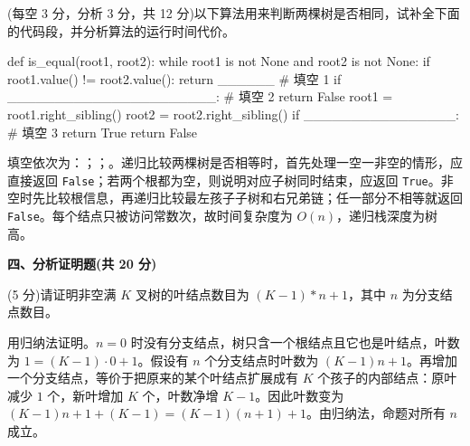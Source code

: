 \begin{question}
(每空 3 分，分析 3 分，共 12 分)以下算法用来判断两棵树是否相同，试补全下面的代码段，并分析算法的运行时间代价。
\begin{pycode}
def is_equal(root1, root2):
    while root1 is not None and root2 is not None:
        if root1.value() != root2.value():
            return ______          # 填空 1
        if ______________________: # 填空 2
            return False
        root1 = root1.right_sibling()
        root2 = root2.right_sibling()
    if ________________:           # 填空 3
        return True
    return False
\end{pycode}
\begin{solution}
填空依次为：\texttt{}；\texttt{}；\texttt{}。递归比较两棵树是否相等时，首先处理一空一非空的情形，应直接返回 \texttt{False}；若两个根都为空，则说明对应子树同时结束，应返回 \texttt{True}。非空时先比较根信息，再递归比较最左孩子子树和右兄弟链；任一部分不相等就返回 \texttt{False}。每个结点只被访问常数次，故时间复杂度为 $O(n)$，递归栈深度为树高。
\end{solution}
\end{question}

\textbf{四、分析证明题(共 20 分)}

\begin{question}
(5 分)请证明非空满 $K$ 叉树的叶结点数目为 $(K-1)*n+1$，其中 $n$ 为分支结点数目。
\begin{solution}
用归纳法证明。$n=0$ 时没有分支结点，树只含一个根结点且它也是叶结点，叶数为 $1=(K-1)\cdot0+1$。假设有 $n$ 个分支结点时叶数为 $(K-1)n+1$。再增加一个分支结点，等价于把原来的某个叶结点扩展成有 $K$ 个孩子的内部结点：原叶减少 $1$ 个，新叶增加 $K$ 个，叶数净增 $K-1$。因此叶数变为 $(K-1)n+1+(K-1)=(K-1)(n+1)+1$。由归纳法，命题对所有 $n$ 成立。
\end{solution}
\end{question}

